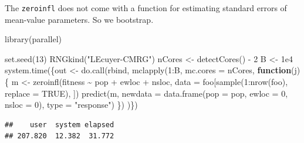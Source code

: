 \documentclass[
  ignorenonframetext,
]{beamer}
\newenvironment{Shaded}{\begin{snugshade}}{\end{snugshade}}
\newcommand{\AttributeTok}[1]{\textcolor[rgb]{0.77,0.63,0.00}{#1}}
\newcommand{\ConstantTok}[1]{\textcolor[rgb]{0.00,0.00,0.00}{#1}}
\newcommand{\ControlFlowTok}[1]{\textcolor[rgb]{0.13,0.29,0.53}{\textbf{#1}}}
\newcommand{\DecValTok}[1]{\textcolor[rgb]{0.00,0.00,0.81}{#1}}
\newcommand{\FloatTok}[1]{\textcolor[rgb]{0.00,0.00,0.81}{#1}}
\newcommand{\FunctionTok}[1]{\textcolor[rgb]{0.00,0.00,0.00}{#1}}
\newcommand{\NormalTok}[1]{#1}
\newcommand{\OtherTok}[1]{\textcolor[rgb]{0.56,0.35,0.01}{#1}}
\newcommand{\SpecialCharTok}[1]{\textcolor[rgb]{0.00,0.00,0.00}{#1}}
\newcommand{\StringTok}[1]{\textcolor[rgb]{0.31,0.60,0.02}{#1}}
\begin{document}
\begin{frame}[fragile]{}
\protect\hypertarget{section-46}{}
The \texttt{zeroinfl} does not come with a function for estimating
standard errors of mean-value parameters. So we bootstrap.

\vspace{12pt}
\tiny

\begin{Shaded}
\begin{Highlighting}[]
\FunctionTok{library}\NormalTok{(parallel)}
\end{Highlighting}
\end{Shaded}

\begin{Shaded}
\begin{Highlighting}[]
\FunctionTok{set.seed}\NormalTok{(}\DecValTok{13}\NormalTok{)}
\FunctionTok{RNGkind}\NormalTok{(}\StringTok{"L\textquotesingle{}Ecuyer{-}CMRG"}\NormalTok{)}
\NormalTok{nCores }\OtherTok{\textless{}{-}} \FunctionTok{detectCores}\NormalTok{() }\SpecialCharTok{{-}} \DecValTok{2}
\NormalTok{B }\OtherTok{\textless{}{-}} \FloatTok{1e4}
\FunctionTok{system.time}\NormalTok{(\{out }\OtherTok{\textless{}{-}} \FunctionTok{do.call}\NormalTok{(rbind, }\FunctionTok{mclapply}\NormalTok{(}\DecValTok{1}\SpecialCharTok{:}\NormalTok{B, }\AttributeTok{mc.cores =}\NormalTok{ nCores, }
                               \ControlFlowTok{function}\NormalTok{(j)\{}
\NormalTok{    m }\OtherTok{\textless{}{-}} \FunctionTok{zeroinfl}\NormalTok{(fitness }\SpecialCharTok{\textasciitilde{}}\NormalTok{ pop }\SpecialCharTok{+}\NormalTok{ ewloc }\SpecialCharTok{+}\NormalTok{ nsloc, }
                  \AttributeTok{data =}\NormalTok{ foo[}\FunctionTok{sample}\NormalTok{(}\DecValTok{1}\SpecialCharTok{:}\FunctionTok{nrow}\NormalTok{(foo), }\AttributeTok{replace =} \ConstantTok{TRUE}\NormalTok{), ])}
    \FunctionTok{predict}\NormalTok{(m, }\AttributeTok{newdata =} \FunctionTok{data.frame}\NormalTok{(}\AttributeTok{pop =}\NormalTok{ pop, }\AttributeTok{ewloc =} \DecValTok{0}\NormalTok{, }\AttributeTok{nsloc =} \DecValTok{0}\NormalTok{), }
            \AttributeTok{type =} \StringTok{"response"}\NormalTok{)}
\NormalTok{  \})}
\NormalTok{)\})}
\end{Highlighting}
\end{Shaded}

\begin{verbatim}
##    user  system elapsed 
## 207.820  12.382  31.772
\end{verbatim}
\end{frame}
\end{document}
